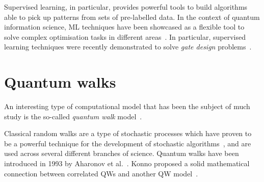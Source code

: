 Supervised learning, in particular, provides powerful tools to build algorithms able to pick up patterns from sets of pre-labelled data.
In the context of quantum information science, \ac{ML} techniques have been showcased as a flexible tool to solve complex optimisation tasks in different areas~\cite{zdeborov2017machine,carrasquilla2017machine,carleo2017solving,van2017learning,schoenholz2016structural,torlai2017manybody,rocchetto2019experimental,melnikov2018active,banchi2016quantum,fujita2018construction,innocenti2018supervised}.
In particular, supervised learning techniques were recently demonstrated to solve \emph{gate design} problems~\cite{banchi2016quantum,innocenti2018supervised}.


\section{Quantum walks}
\label{sec:intro:QWs}

An interesting type of computational model that has been the subject of much study is the so-called \textit{quantum walk} model~\cite{aharonov2000quantum,kempe2003quantum,venegasandraca2012quantum,portugal2013quantum}.

Classical random walks are a type of stochastic processes which have proven to be a powerful technique for the development of stochastic algorithms~\cite{motwani1995randomized,schoning1999probabilistic}, and are used across several different branches of science.
Quantum walks have been introduced in 1993 by Aharonov et al.~\cite{aharonov1993quantum}.
Konno proposed a solid mathematical connection between correlated \acp{QW} and another QW model~\cite{konno2003limit}.

